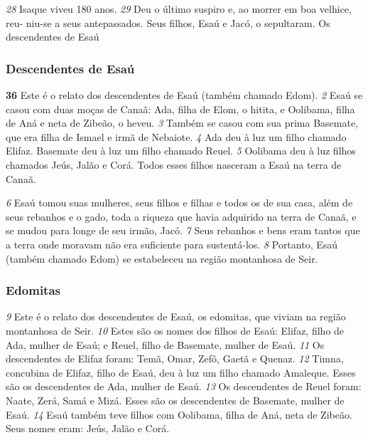 \bigskip   
\textit{\tiny 28}
Isaque viveu 180 anos. 
\textit{\tiny 29}
Deu o último suspiro e, ao morrer em boa velhice, reu-
niu-se a seus antepassados. Seus filhos, Esaú e Jacó, o sepultaram.
Os descendentes de Esaú
   
\bigskip   
\subsubsection*{Descendentes de Esaú}
\textbf{\large 36}
 Este é o relato dos descendentes de Esaú (também chamado Edom). 
\textit{\tiny 2} 
Esaú
se casou com duas moças de Canaã: Ada, filha de Elom, o hitita, e Oolibama, filha
de Aná e neta de Zibeão, o heveu. 
\textit{\tiny 3} 
Também se casou com sua prima Basemate,
que era filha de Ismael e irmã de Nebaiote. 
\textit{\tiny 4} 
Ada deu à luz um filho chamado
Elifaz. Basemate deu à luz um filho chamado Reuel. 
\textit{\tiny 5} 
Oolibama deu à luz filhos
chamados Jeús, Jalão e Corá. Todos esses filhos nasceram a Esaú na terra de
Canaã. 

\bigskip   
\textit{\tiny 6} 
Esaú tomou suas mulheres, seus filhos e filhas e todos os de sua casa, além de
seus rebanhos e o gado, toda a riqueza que havia adquirido na terra de Canaã, e se
mudou para longe de seu irmão, Jacó. 
\textit{\tiny 7} 
Seus rebanhos e bens eram tantos que a
terra onde moravam não era suficiente para sustentá-los. 
\textit{\tiny 8} 
Portanto, Esaú
(também chamado Edom) se estabeleceu na região montanhosa de Seir. 

\bigskip   
\subsubsection*{Edomitas}
\textit{\tiny 9} 
Este é o relato dos descendentes de Esaú, os edomitas, que viviam na região
montanhosa de Seir.
\textit{\tiny 10}
Estes são os nomes dos filhos de Esaú: Elifaz, filho de Ada, mulher de Esaú; e
 Reuel, filho de Basemate, mulher de Esaú.
\textit{\tiny 11}
Os descendentes de Elifaz foram: Temã, Omar, Zefô, Gaetã e Quenaz. 
\textit{\tiny 12}
Timna,
 concubina de Elifaz, filho de Esaú, deu à luz um filho chamado Amaleque. Esses
 são os descendentes de Ada, mulher de Esaú.
\textit{\tiny 13}
Os descendentes de Reuel foram: Naate, Zerá, Samá e Mizá. Esses são os
 descendentes de Basemate, mulher de Esaú.
\textit{\tiny 14}
Esaú também teve filhos com Oolibama, filha de Aná, neta de Zibeão. Seus
 nomes eram: Jeús, Jalão e Corá.

